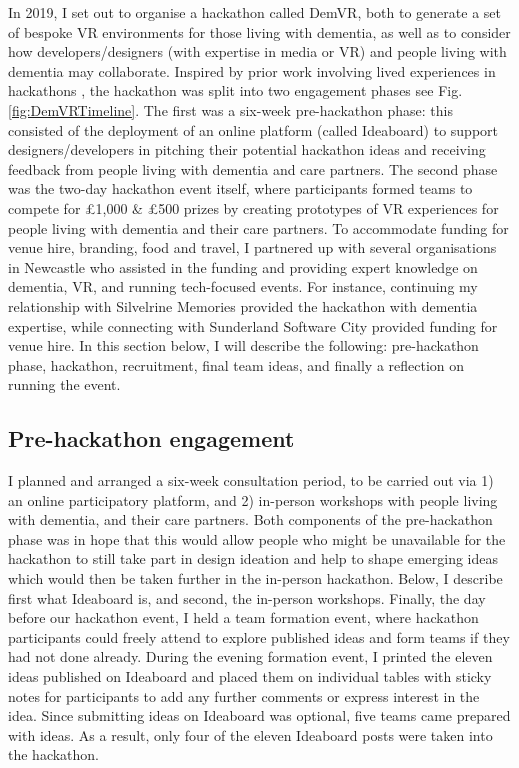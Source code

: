 In 2019, I set out to organise a hackathon called DemVR, both to generate a set of bespoke VR environments for those living with dementia, as well as to consider how developers/designers (with expertise in media or VR) and people living with dementia may collaborate. Inspired by prior work involving lived experiences in hackathons \citep{birbeck_self_2017}, the hackathon was split into two engagement phases see Fig.\ref{fig:DemVRTimeline}. The first was a six-week pre-hackathon phase: this consisted of the deployment of an online platform (called Ideaboard) to support designers/developers in pitching their potential hackathon ideas and receiving feedback from people living with dementia and care partners. The second phase was the two-day hackathon event itself, where participants formed teams to compete for £1,000 \& £500 prizes by creating prototypes of VR experiences for people living with dementia and their care partners. To accommodate funding for venue hire, branding, food and travel, I partnered up with several organisations in Newcastle who assisted in the funding and providing expert knowledge on dementia, VR, and running tech-focused events. For instance, continuing my relationship with Silvelrine Memories provided the hackathon with dementia expertise, while connecting with Sunderland Software City provided funding for venue hire. In this section below, I will describe the following: pre-hackathon phase, hackathon, recruitment, final team ideas, and finally a reflection on running the event.

\subsection{Pre-hackathon engagement}
\label{sec:EventPrehackathon}
I planned and arranged a six-week consultation period, to be carried out via 1) an online participatory platform, and 2) in-person workshops with people living with dementia, and their care partners. Both components of the pre-hackathon phase was in hope that this would allow people who might be unavailable for the hackathon to still take part in design ideation and help to shape emerging ideas which would then be taken further in the in-person hackathon. Below, I describe first what Ideaboard is, and second, the in-person workshops. Finally, the day before our hackathon event, I held a team formation event, where hackathon participants could freely attend to explore published ideas and form teams if they had not done already. During the evening formation event, I printed the eleven ideas published on Ideaboard and placed them on individual tables with sticky notes for participants to add any further comments or express interest in the idea. Since submitting ideas on Ideaboard was optional, five teams came prepared with ideas. As a result, only four of the eleven Ideaboard posts were taken into the hackathon. 

